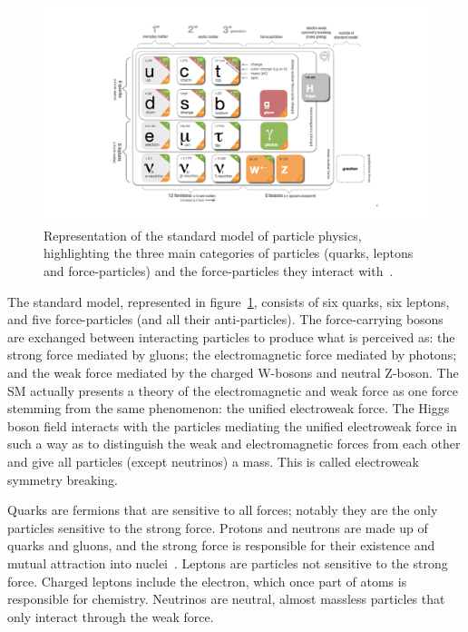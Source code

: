 \begin{figure}
    \centering
    \includegraphics[width = \textwidth]{figures/standardmodel_galbraith_carsten.png}
    \caption{Representation of the standard model of particle physics, highlighting the three main categories of particles (quarks, leptons and force-particles) and the force-particles they interact with~\cite{galbraith_ux_2013}.}
    \label{fig:standard_model}
\end{figure}

The standard model, represented in figure~\ref{fig:standard_model}, consists of six quarks, six leptons, and five force-particles (and all their anti-particles). The force-carrying bosons are exchanged between interacting particles to produce what is perceived as: the strong force mediated by gluons; the electromagnetic force mediated by photons; and the weak force mediated by the charged W-bosons and neutral Z-boson. The SM actually presents a theory of the electromagnetic and weak force as one force stemming from the same phenomenon: the unified electroweak force. The Higgs boson field interacts with the particles mediating the unified electroweak force in such a way as to distinguish the weak and electromagnetic forces from each other and give all particles (except neutrinos) a mass. This is called electroweak symmetry breaking. 

Quarks are fermions that are sensitive to all forces; notably they are the only particles sensitive to the strong force. Protons and neutrons are made up of quarks and gluons, and the strong force is responsible for their existence and mutual attraction into nuclei~\cite{bertulani_nuclear_2007}. Leptons are particles not sensitive to the strong force. Charged leptons include the electron, which once part of atoms is responsible for chemistry. Neutrinos are neutral, almost massless particles that only interact through the weak force. 

